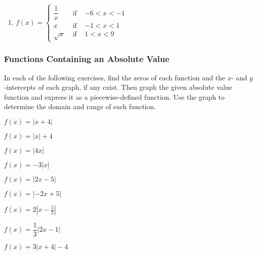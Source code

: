 \documentclass[12pt]{book}
\theoremstyle{definition}
\begin{document}
\begin{enumerate}[resume]

\item ${\displaystyle f(x) = \left\{ \begin{array}{rcl} \dfrac{1}{x} & \mbox{ if } & -6 < x < -1\\
                                                                  x & \mbox{ if } & -1 < x < 1 \\
                                                           \sqrt{x} & \mbox{ if } & 1 < x < 9  
                                     \end{array} \right. }$
\end{enumerate}
\newpage
\subsubsection{Functions Containing an Absolute Value}
In each of the following exercises, find the zeros of each function and the $x$- and $y$-intercepts of each graph, if any exist.  Then graph the given absolute value function and express it as a piecewise-defined function.  Use the graph to determine the domain and range of each function.
\begin{enumerate}
\begin{multicols}{3}
\item $f(x) = |x + 4|$
\item $f(x) = |x| + 4$
\item $f(x) = |4x|$
\item $f(x) = -3|x|$ 
\item $f(x) = |2x -5|$ 
\item $f(x) = |-2x+5|$
\item $f(x) = 2|x-\frac{5}{2}|$
\item $f(x) = \dfrac{1}{3}|2x - 1|$
\item $f(x) = 3|x + 4| - 4$ 
\end{multicols}
\end{enumerate}
\end{document}
